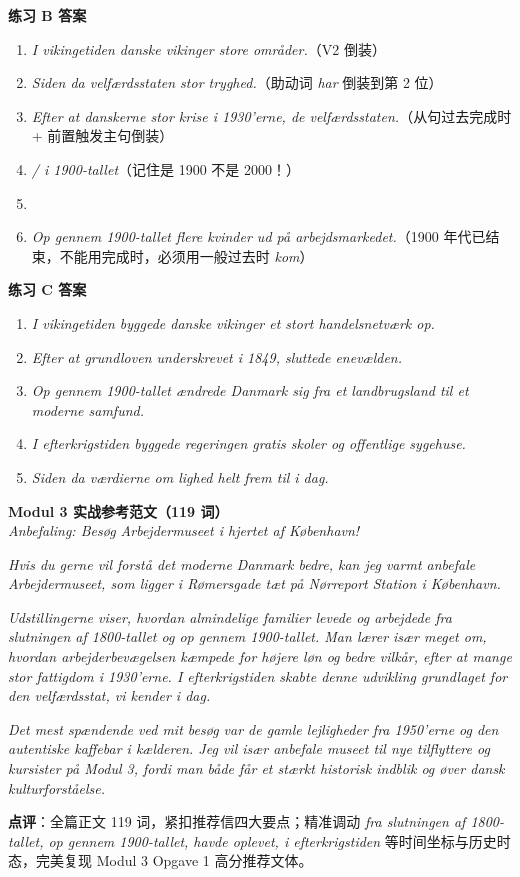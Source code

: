 \begin{answerbox}
\textbf{练习 B 答案}
\begin{enumerate}
  \item \textit{I vikingetiden  danske vikinger store områder.}（V2 倒装）
  \item \textit{Siden da  velfærdsstaten  stor tryghed.}（助动词 \textit{har} 倒装到第 2 位）
  \item \textit{Efter at danskerne  stor krise i 1930'erne,  de velfærdsstaten.}（从句过去完成时 + 前置触发主句倒装）
  \item \textit{ / i 1900-tallet}（记住是 1900 不是 2000！）
  \item \textit{}
  \item \textit{Op gennem 1900-tallet  flere kvinder ud på arbejdsmarkedet.}（1900 年代已结束，不能用完成时，必须用一般过去时 \textit{kom}）
\end{enumerate}

\textbf{练习 C 答案}
\begin{enumerate}
  \item \textit{I vikingetiden byggede danske vikinger et stort handelsnetværk op.}
  \item \textit{Efter at grundloven  underskrevet i 1849, sluttede enevælden.}
  \item \textit{Op gennem 1900-tallet ændrede Danmark sig fra et landbrugsland til et moderne samfund.}
  \item \textit{I efterkrigstiden byggede regeringen gratis skoler og offentlige sygehuse.}
  \item \textit{Siden da  værdierne om lighed  helt frem til i dag.}
\end{enumerate}

\textbf{Modul 3 实战参考范文（119 词）}\\
\textit{Anbefaling: Besøg Arbejdermuseet i hjertet af København!}

\textit{Hvis du gerne vil forstå det moderne Danmark bedre, kan jeg varmt anbefale Arbejdermuseet, som ligger i Rømersgade tæt på Nørreport Station i København.}

\textit{Udstillingerne viser, hvordan almindelige familier levede og arbejdede fra slutningen af 1800-tallet og op gennem 1900-tallet. Man lærer især meget om, hvordan arbejderbevægelsen kæmpede for højere løn og bedre vilkår, efter at mange  stor fattigdom i 1930'erne. I efterkrigstiden skabte denne udvikling grundlaget for den velfærdsstat, vi kender i dag.}

\textit{Det mest spændende ved mit besøg var de gamle lejligheder fra 1950'erne og den autentiske kaffebar i kælderen. Jeg vil især anbefale museet til nye tilflyttere og kursister på Modul 3, fordi man både får et stærkt historisk indblik og øver dansk kulturforståelse.}

\small\textbf{点评}：全篇正文 119 词，紧扣推荐信四大要点；精准调动 \textit{fra slutningen af 1800-tallet, op gennem 1900-tallet, havde oplevet, i efterkrigstiden} 等时间坐标与历史时态，完美复现 Modul 3 Opgave 1 高分推荐文体。
\end{answerbox}
